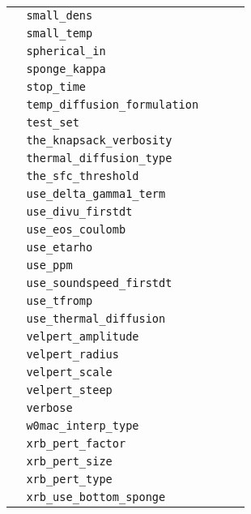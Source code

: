 \begin{center}
\begin{longtable}{|l|p{3.0in}|l|}
\verb=  small_dens  = &   &   \\
\verb=  small_temp  = &   &   \\
\verb=  spherical_in  = &   &   \\
\verb=  sponge_kappa  = &   &   \\
\verb=  stop_time  = &   &   \\
\verb=  temp_diffusion_formulation  = &   &   \\
\verb=  test_set  = &   &   \\
\verb=  the_knapsack_verbosity  = &   &   \\
\verb=  thermal_diffusion_type  = &   &   \\
\verb=  the_sfc_threshold  = &   &   \\
\verb=  use_delta_gamma1_term  = &   &   \\
\verb=  use_divu_firstdt  = &   &   \\
\verb=  use_eos_coulomb  = &   &   \\
\verb=  use_etarho  = &   &   \\
\verb=  use_ppm  = &   &   \\
\verb=  use_soundspeed_firstdt  = &   &   \\
\verb=  use_tfromp  = &   &   \\
\verb=  use_thermal_diffusion  = &   &   \\
\verb=  velpert_amplitude  = &   &   \\
\verb=  velpert_radius  = &   &   \\
\verb=  velpert_scale  = &   &   \\
\verb=  velpert_steep  = &   &   \\
\verb=  verbose  = &   &   \\
\verb=  w0mac_interp_type  = &   &   \\
\verb=  xrb_pert_factor  = &   &   \\
\verb=  xrb_pert_size  = &   &   \\
\verb=  xrb_pert_type  = &   &   \\
\verb=  xrb_use_bottom_sponge  = &   &   \\


\end{longtable}
\end{center}
%
